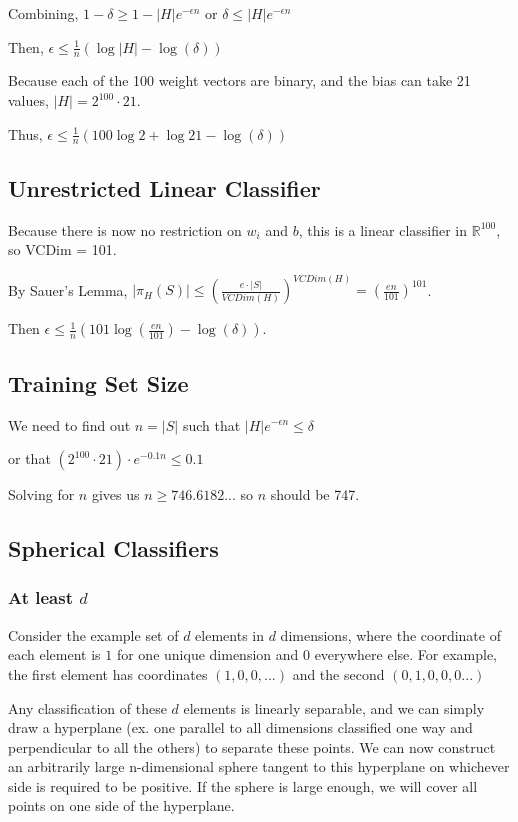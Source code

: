 \documentclass[]{article}
\begin{document}
Combining, $1-\delta \ge 1 - |H|e^{-\epsilon n}$ or $\delta \le |H|e^{-\epsilon n}$

Then, $\epsilon \le \frac{1}{n}(\log |H| - \log (\delta))$

Because each of the 100 weight vectors are binary, and the bias can take 21 values, $|H| = 2^{100} \cdot 21$.

Thus, $\epsilon \le \frac{1}{n} (100 \log 2 + \log 21 - \log(\delta))$

\subsection{Unrestricted Linear Classifier}
Because there is now no restriction on $w_i$ and $b$, this is a linear classifier in $\mathbb{R}^{100}$, so VCDim = 101.

By Sauer's Lemma, $|\pi_H(S)| \le (\frac{e\cdot |S|}{VCDim(H)})^{VCDim(H)} = (\frac{en}{101})^{101}$.

Then $\epsilon \le \frac{1}{n}(101\log(\frac{en}{101}) - \log(\delta))$.

\subsection{Training Set Size}

We need to find out $n=|S|$ such that $|H|e^{-\epsilon n} \le \delta$

or that $(2^{100} \cdot 21)\cdot e^{-0.1n} \le 0.1$

Solving for $n$ gives us $n \ge 746.6182...$ so $n$ should be 747.

\subsection{Spherical Classifiers}

\subsubsection{At least $d$}
Consider the example set of $d$ elements in $d$ dimensions, where the coordinate of each element is $1$ for one unique dimension and $0$ everywhere else. For example, the first element has coordinates $(1,0,0,...)$ and the second $(0,1,0,0,0...)$

Any classification of these $d$ elements is linearly separable, and we can simply draw a hyperplane (ex. one parallel to all dimensions classified one way and perpendicular to all the others) to separate these points. We can now construct an arbitrarily large n-dimensional sphere tangent to this hyperplane on whichever side is required to be positive. If the sphere is large enough, we will cover all points on one side of the hyperplane.
\end{document}
